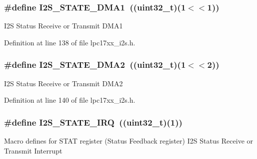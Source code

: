 \hypertarget{group___i2_s___private___macros_ga0e9a701addd279db953ca34d56487dbd}{
\subsubsection[{\-I2\-S\-\_\-\-S\-T\-A\-T\-E\-\_\-\-D\-M\-A1}]{\setlength{\rightskip}{0pt plus 5cm}\#define {\bf \-I2\-S\-\_\-\-S\-T\-A\-T\-E\-\_\-\-D\-M\-A1}~((uint32\-\_\-t)(1$<$$<$1))}}\label{group___i2_s___private___macros_ga0e9a701addd279db953ca34d56487dbd}
\-I2\-S \-Status \-Receive or \-Transmit \-D\-M\-A1 

\-Definition at line 138 of file lpc17xx\-\_\-i2s.\-h.

\hypertarget{group___i2_s___private___macros_ga84dfa37fbee79986ec79f4d856b8df24}{
\subsubsection[{\-I2\-S\-\_\-\-S\-T\-A\-T\-E\-\_\-\-D\-M\-A2}]{\setlength{\rightskip}{0pt plus 5cm}\#define {\bf \-I2\-S\-\_\-\-S\-T\-A\-T\-E\-\_\-\-D\-M\-A2}~((uint32\-\_\-t)(1$<$$<$2))}}\label{group___i2_s___private___macros_ga84dfa37fbee79986ec79f4d856b8df24}
\-I2\-S \-Status \-Receive or \-Transmit \-D\-M\-A2 

\-Definition at line 140 of file lpc17xx\-\_\-i2s.\-h.

\hypertarget{group___i2_s___private___macros_gaa412bd295235fcd4d7f0ad284d9386de}{
\subsubsection[{\-I2\-S\-\_\-\-S\-T\-A\-T\-E\-\_\-\-I\-R\-Q}]{\setlength{\rightskip}{0pt plus 5cm}\#define {\bf \-I2\-S\-\_\-\-S\-T\-A\-T\-E\-\_\-\-I\-R\-Q}~((uint32\-\_\-t)(1))}}\label{group___i2_s___private___macros_gaa412bd295235fcd4d7f0ad284d9386de}
\-Macro defines for \-S\-T\-A\-T register (\-Status \-Feedback register) \-I2\-S \-Status \-Receive or \-Transmit \-Interrupt 

